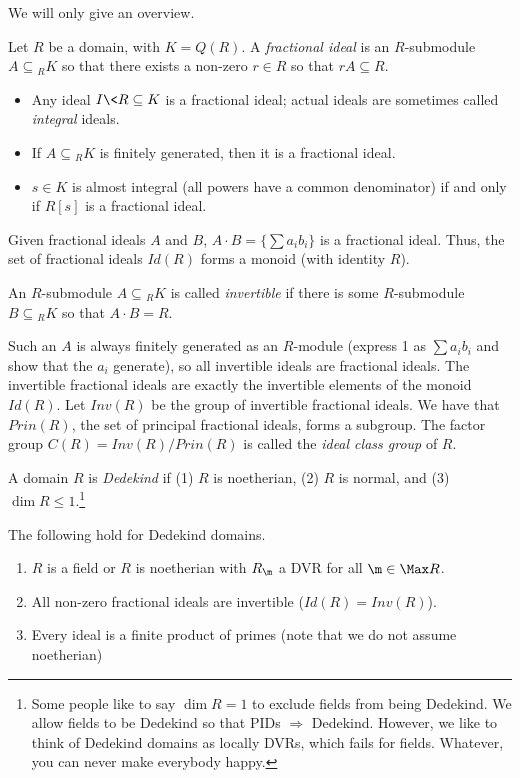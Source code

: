  We will only give an overview.

 Let $R$ be a domain, with $K=Q(R)$. A \emph{fractional ideal} is an $R$-submodule
 $A\subseteq {}_R K$ so that there exists a non-zero $r\in R$ so that $rA\subseteq R$.
 \begin{example}
   \begin{itemize}
   \item Any ideal $I\< R\subseteq K$ is a fractional ideal; actual ideals are
   sometimes called \emph{integral} ideals.

   \item If $A\subseteq {}_R K$ is finitely generated, then it is a fractional ideal.

   \item $s\in K$ is almost integral (all powers have a common denominator) if and only
   if $R[s]$ is a fractional ideal.
   \end{itemize}
   \vspace*{-1.7\baselineskip}
 \end{example}
 Given fractional ideals $A$ and $B$, $A\cdot B=\{\sum a_ib_i\}$ is a fractional ideal.
 Thus, the set of fractional ideals $Id(R)$ forms a monoid (with identity $R$).
 \begin{definition}
   An $R$-submodule $A\subseteq {}_RK$ is called \emph{invertible} if there is some
   $R$-submodule $B\subseteq {}_RK$ so that $A\cdot B=R$.
 \end{definition}
 Such an $A$ is always finitely generated as an $R$-module (express 1 as $\sum a_ib_i$
 and show that the $a_i$ generate), so all invertible ideals are fractional ideals. The
 invertible fractional ideals are exactly the invertible elements of the monoid $Id(R)$.
 Let $Inv(R)$ be the group of invertible fractional ideals. We have that $Prin(R)$, the
 set of principal fractional ideals, forms a subgroup. The factor group
 $C(R)=Inv(R)/Prin(R)$ is called the \emph{ideal class group} of $R$.

 \begin{definition}
   A domain $R$ is \emph{Dedekind} if (1) $R$ is noetherian, (2) $R$ is normal, and (3)
   $\dim R\le 1$.\footnote{Some people like to say $\dim R=1$ to exclude fields from
   being Dedekind. We allow fields to be Dedekind so that PIDs $\Rightarrow$ Dedekind.
   However, we like to think of Dedekind domains as locally DVRs, which fails for fields.
   Whatever, you can never make everybody happy.}
 \end{definition}
 The following hold for Dedekind domains.
 \begin{enumerate}
   \item $R$ is a field or $R$ is noetherian with $R_\m$ a DVR for all $\m\in \Max R$.
   \item All non-zero fractional ideals are invertible ($Id(R)=Inv(R)$).
   \item Every ideal is a finite product of primes (note that we do not assume
   noetherian)
 \end{enumerate}
 \setcounter{lecture}{39}

